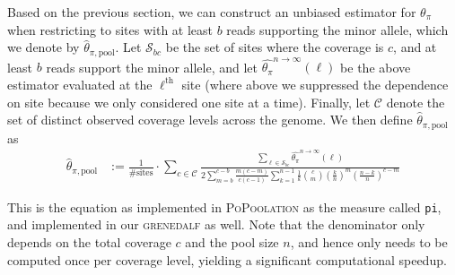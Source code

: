 \documentclass[a4paper,fontsize=9pt,DIV=14]{scrartcl}
\newcounter{todo}
\newcommand\todo[1]{}
\newcommand\toolname{\textsc}
\newcommand{\samplesize}{n}
\newcommand{\coverage}{c}
\newcommand{\thetapi}{\widehat{\theta_\pi}}
\begin{document}
Based on the previous section, we can construct an unbiased estimator for $\theta_\pi$ when restricting to sites with at least $b$ reads supporting the minor allele, which we denote by $\widehat{\theta}_{\pi,\text{pool}}$.  Let $\mathcal{S}_{bc}$ be the set of sites where the coverage is $c$, and at least $b$ reads support the minor allele, and let $\thetapi^{\samplesize\to\infty}(\ell)$ be the above estimator evaluated at the $\ell^\text{th}$ site (where above we suppressed the dependence on site because we only considered one site at a time).  Finally, let $\mathcal{C}$ denote the set of distinct observed coverage levels across the genome.  We then define  $\widehat{\theta}_{\pi,\text{pool}}$ as
%
\begin{align}
    \label{eq:ThetaPiPoolEstimate}
     \widehat{\theta}_{\pi,\text{pool}} &:= \frac{1}{\# \text{sites}} \cdot \sum_{c\in \mathcal{C}}
    \frac{
       \sum_{\ell \in \mathcal{S}_{bc}} \thetapi^{\samplesize\to\infty}(\ell)
    }{
        2\sum_{m=b}^{\coverage-b} \frac{m(\coverage-m)}{\coverage(\coverage-1)} \sum_{k=1}^{n-1} \frac{1}{k} \binom{\coverage}{m} \left(\frac{k}{\samplesize}\right)^m \left(\frac{\samplesize-k}{\samplesize}\right)^{\coverage-m}
    }
\end{align}
%
\todo{Hey Jeff, I think we need to change the above a bit. In the denominator, the coverage $c$ can be different per site, and hence needs to be evaluated at each site individually. Hence, in my original forumation of this, I just gave the equation for a single site, and then said that they are summed over all sites. Shall I change it back to that?  JPS: I changed this a bit. Let me know if it's unclear.  Basically we now do a weighted average over coverage levels and debias each coverage level appropriately.}

This is the equation as implemented in \toolname{PoPoolation} as the measure called \texttt{pi},
and implemented in our \toolname{grenedalf} as well. Note that the denominator only depends on the total coverage $\coverage$ and the pool size $\samplesize$, and hence only needs to be computed once per coverage level, yielding a significant computational speedup.


%
\end{document}
